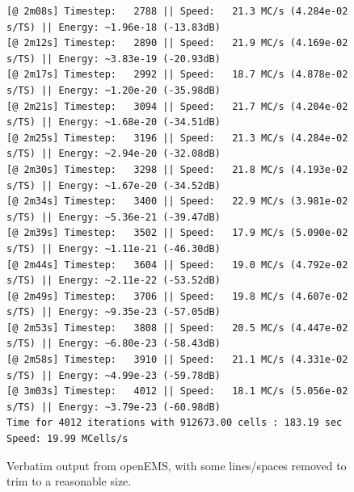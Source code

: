 \documentclass[twocolumn]{article}
\begin{document}
\begin{figure}[p,h!]
\begin{verbatim}
[@ 2m08s] Timestep:   2788 || Speed:   21.3 MC/s (4.284e-02 s/TS) || Energy: ~1.96e-18 (-13.83dB)
[@ 2m12s] Timestep:   2890 || Speed:   21.9 MC/s (4.169e-02 s/TS) || Energy: ~3.83e-19 (-20.93dB)
[@ 2m17s] Timestep:   2992 || Speed:   18.7 MC/s (4.878e-02 s/TS) || Energy: ~1.20e-20 (-35.98dB)
[@ 2m21s] Timestep:   3094 || Speed:   21.7 MC/s (4.204e-02 s/TS) || Energy: ~1.68e-20 (-34.51dB)
[@ 2m25s] Timestep:   3196 || Speed:   21.3 MC/s (4.284e-02 s/TS) || Energy: ~2.94e-20 (-32.08dB)
[@ 2m30s] Timestep:   3298 || Speed:   21.8 MC/s (4.193e-02 s/TS) || Energy: ~1.67e-20 (-34.52dB)
[@ 2m34s] Timestep:   3400 || Speed:   22.9 MC/s (3.981e-02 s/TS) || Energy: ~5.36e-21 (-39.47dB)
[@ 2m39s] Timestep:   3502 || Speed:   17.9 MC/s (5.090e-02 s/TS) || Energy: ~1.11e-21 (-46.30dB)
[@ 2m44s] Timestep:   3604 || Speed:   19.0 MC/s (4.792e-02 s/TS) || Energy: ~2.11e-22 (-53.52dB)
[@ 2m49s] Timestep:   3706 || Speed:   19.8 MC/s (4.607e-02 s/TS) || Energy: ~9.35e-23 (-57.05dB)
[@ 2m53s] Timestep:   3808 || Speed:   20.5 MC/s (4.447e-02 s/TS) || Energy: ~6.80e-23 (-58.43dB)
[@ 2m58s] Timestep:   3910 || Speed:   21.1 MC/s (4.331e-02 s/TS) || Energy: ~4.99e-23 (-59.78dB)
[@ 3m03s] Timestep:   4012 || Speed:   18.1 MC/s (5.056e-02 s/TS) || Energy: ~3.79e-23 (-60.98dB)
Time for 4012 iterations with 912673.00 cells : 183.19 sec
Speed: 19.99 MCells/s
\end{verbatim}
\caption{Verbatim output from openEMS, with some lines/spaces removed to trim to a reasonable size.}
\end{figure}
\normalsize
\end{document}
